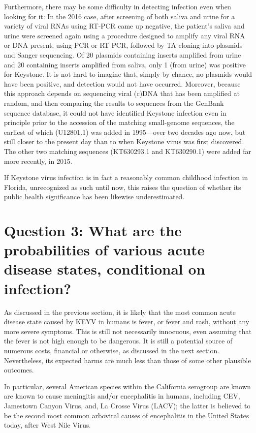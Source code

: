 \documentclass[12pt]{article}
\begin{document}
            Furthermore, there may be some difficulty in detecting infection even when looking for it: In the 2016 case, after screening of both saliva and urine for a variety of viral RNAs using RT-PCR came up negative, the patient's saliva and urine were screened again using a procedure designed to amplify any viral RNA or DNA present, using PCR or RT-PCR, followed by TA-cloning into plasmids and Sanger sequencing. Of 20 plasmids containing inserts amplified from urine and 20 containing inserts amplified from saliva, only 1 (from urine) was positive for Keystone. It is not hard to imagine that, simply by chance, no plasmids would have been positive, and detection would not have occurred. Moreover, because this approach depends on sequencing viral (c)DNA that has been amplified at random, and then comparing the results to sequences from the GenBank sequence database, it could not have identified Keystone infection even in principle prior to the accession of the matching small-genome sequences, the earliest of which (U12801.1) was added in 1995\cite{genbankU12801.1}---over two decades ago now, but still closer to the present day than to when Keystone virus was first discovered. The other two matching sequences (KT630293.1 and KT630290.1) were added far more recently, in 2015\cite{genbankKT630293.1,genbankKT630290.1}.

            If Keystone virus infection is in fact a reasonably common childhood infection in Florida, unrecognized as such until now, this raises the question of whether its public health significance has been likewise underestimated.


    \section[Probabilities of disease, given infection]{Question 3: What are the probabilities of various acute disease states, conditional on infection?}
        \label{probabilities}
        As discussed in the previous section, it is likely that the most common acute disease state caused by KEYV in humans is fever, or fever and rash, without any more severe symptoms. This is still not necessarily innocuous, even assuming that the fever is not high enough to be dangerous. It is still a potential source of numerous costs, financial or otherwise, as discussed in the next section. Nevertheless, its expected harms are much less than those of some other plausible outcomes.

        In particular, several American species within the California serogroup are known are known to cause meningitis and/or encephalitis in humans, including CEV, Jamestown Canyon Virus, and, La Crosse Virus (LACV); the latter is believed to be the second most common arboviral causes of encephalitis in the United States today, after West Nile Virus.
\end{document}
